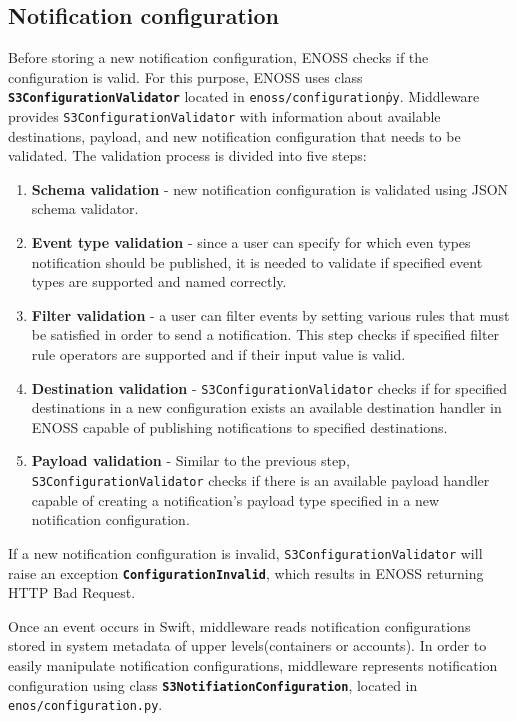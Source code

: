     \subsection{Notification configuration}
    Before storing a new notification configuration, ENOSS checks if the configuration is valid. For this purpose, ENOSS uses class \textbf{\texttt{S3ConfigurationValidator}} located in \texttt{enoss/configuration\.py}. Middleware provides \texttt{S3ConfigurationValidator} with information about available destinations, payload, and new notification configuration that needs to be validated. The validation process is divided into five steps:
    \begin{enumerate}
        \item \textbf{Schema validation} - new notification configuration is validated using JSON schema validator.
        \item \textbf{Event type validation} - since a user can specify for which even types notification should be published, it is needed to validate if specified event types are supported and named correctly.
        \item \textbf{Filter validation} - a user can filter events by setting various rules that must be satisfied in order to send a notification. This step checks if specified filter rule operators are supported and if their input value is valid.
        \item \textbf{Destination validation} - \texttt{S3ConfigurationValidator} checks if for specified destinations in a new configuration exists an available destination handler in ENOSS capable of publishing notifications to specified destinations.
        \item \textbf{Payload validation} - Similar to the previous step, \texttt{S3ConfigurationValidator} checks if there is an available payload handler capable of creating a notification's payload type specified in a new notification configuration.
    \end{enumerate}

    If a new notification configuration is invalid, \texttt{S3ConfigurationValidator} will raise an  exception \textbf{\texttt{ConfigurationInvalid}}, which results in ENOSS returning HTTP Bad Request.

    Once an event occurs in Swift, middleware reads notification configurations stored in system metadata of upper levels(containers or accounts). In order to easily manipulate notification configurations, middleware represents notification configuration using class  \textbf{\texttt{S3NotifiationConfiguration}}, located in \texttt{enos/configuration.py}.

